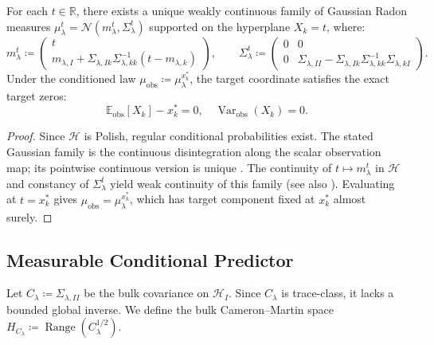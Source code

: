 \begin{lemma}
\label{lem:disintegration}
For each $t \in \mathbb{R}$, there exists a unique weakly continuous family of Gaussian Radon measures $\mu_\lambda^t = \mathcal{N}(m_\lambda^t, \Sigma_\lambda^t)$ supported on the hyperplane $X_k = t$, where:
\begin{equation}
  m_\lambda^t \coloneqq \begin{pmatrix} t \\ m_{\lambda,I} + \Sigma_{\lambda,Ik} \Sigma_{\lambda,kk}^{-1}(t - m_{\lambda,k}) \end{pmatrix}, \qquad
  \Sigma_\lambda^t \coloneqq \begin{pmatrix} 0 & 0 \\ 0 & \Sigma_{\lambda,II} - \Sigma_{\lambda,Ik}\Sigma_{\lambda,kk}^{-1}\Sigma_{\lambda,kI} \end{pmatrix}.
\end{equation}
Under the conditioned law $\mu_{\mathrm{obs}} \coloneqq \mu_\lambda^{x_k^*}$, the target coordinate satisfies the exact target zeros:
\begin{equation}
  \mathbb{E}_{\mathrm{obs}}[X_k] - x_k^* = 0, \quad \operatorname{Var}_{\mathrm{obs}}(X_k) = 0.
\end{equation}
\end{lemma}
\begin{proof}
Since $\mathcal{H}$ is Polish, regular conditional probabilities exist. The stated Gaussian family is the continuous disintegration along the scalar observation map; its pointwise continuous version is unique \cite{lagatta2013continuous}. The continuity of $t \mapsto m_\lambda^t$ in $\mathcal{H}$ and constancy of $\Sigma_\lambda^t$ yield weak continuity of this family (see also \cite{bogachev1998gaussian}). Evaluating at $t=x_k^*$ gives $\mu_{\mathrm{obs}} = \mu_\lambda^{x_k^*}$, which has target component fixed at $x_k^*$ almost surely.
\end{proof}

\subsection{Measurable Conditional Predictor}

Let $C_\lambda \coloneqq \Sigma_{\lambda,II}$ be the bulk covariance on $\mathcal{H}_I$. Since $C_\lambda$ is trace-class, it lacks a bounded global inverse. We define the bulk Cameron--Martin space $H_{C_\lambda} \coloneqq \operatorname{Range}(C_\lambda^{1/2})$.

